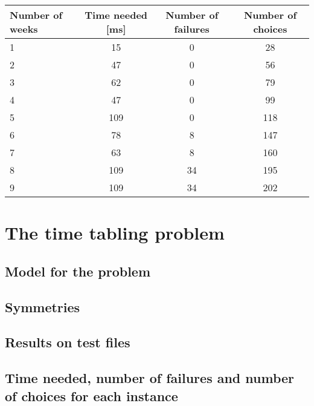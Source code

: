 \documentclass{eplDoc}
\begin{document}
\begin{center}
		\begin{tabular}{|l|c|c|c|}
			\hline
			Number of weeks & Time needed [ms] & Number of failures & Number of choices \\ 
			\hline
			1 & 15 & 0 & 28 \\ 
			2 & 47 & 0 & 56 \\ 
			3 & 62 & 0 & 79 \\ 
			4 & 47 & 0 & 99 \\ 
			5 & 109 & 0 & 118 \\ 
			6 & 78 & 8 & 147 \\ 
			7 & 63 & 8 & 160 \\ 
			8 & 109 & 34 & 195 \\ 
			9 & 109 & 34 & 202 \\ 
			\hline
		\end{tabular}
\end{center}



\section{The time tabling problem} 

\subsection{Model for the problem}

\subsection{Symmetries}

\subsection{Results on test files}

\subsection{Time needed, number of failures and number of choices for each instance}
\end{document}
